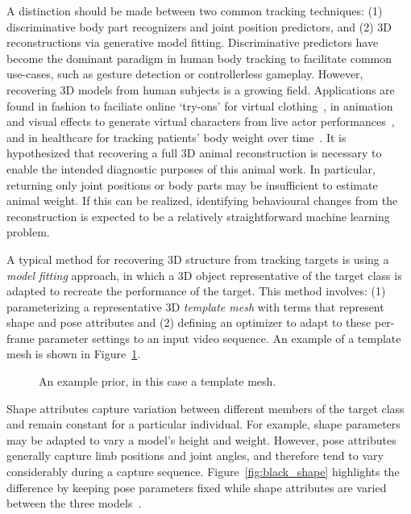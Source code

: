     
    A distinction should be made between two common tracking techniques: (1) discriminative body part recognizers and joint position predictors, and (2) 3D reconstructions via generative model fitting. Discriminative predictors have become the dominant paradigm in human body tracking to facilitate common use-cases, such as gesture detection or controllerless gameplay. However, recovering 3D models from human subjects is a growing field. Applications are found in fashion to faciliate online `try-ons' for virtual clothing~\cite{lin2014digital}, in animation and visual effects to generate virtual characters from live actor performances~\cite{laine2017production}, and in healthcare for tracking patients' body weight over time~\cite{velardo2010weight}. It is hypothesized that recovering a full 3D animal reconstruction is necessary to enable the intended diagnostic purposes of this animal work. In particular, returning only joint positions or body parts may be insufficient to estimate animal weight. If this can be realized, identifying behavioural changes from the reconstruction is expected to be a relatively straightforward machine learning problem. 

    A typical method for recovering 3D structure from tracking targets is using a \emph{model fitting} approach, in which a 3D object representative of the target class is adapted to recreate the performance of the target. This method involves: (1) parameterizing a representative 3D \emph{template mesh} with terms that represent shape and pose attributes and (2) defining an optimizer to adapt to these per-frame parameter settings to an input video sequence. An example of a template mesh is shown in Figure~\ref{fig:arap_template}.
    
    \begin{figure}[H] %
        \caption{An example prior, in this case a template mesh.}
        \label{fig:arap_template}
    \end{figure}

    Shape attributes capture variation between different members of the target class and remain constant for a particular individual. For example, shape parameters may be adapted to vary a model's height and weight. However, pose attributes generally capture limb positions and joint angles, and therefore tend to vary considerably during a capture sequence. Figure~\ref{fig:black_shape} highlights the difference by keeping pose parameters fixed while shape attributes are varied between the three models~\cite{Streuber:SIGGRAPH:2016}.

